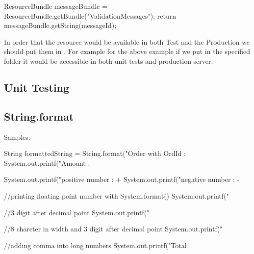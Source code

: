 \begin{javacode}
    ResourceBundle messageBundle = ResourceBundle.getBundle("ValidationMessages");
    return messageBundle.getString(messageId);
\end{javacode}

In order that the resource would be available in both Test and the Production we should put them in . For example for the above example if we put  in the specified folder it would be accessible in both unit tests and production server.
\subsection{Unit Testing}
\subsection{String.format}
Samples:

\begin{javacode}
	String formattedString = String.format("Order with OrdId : %
	 System.out.printf("Amount : %
	 
	 System.out.printf("positive number : +%
	 System.out.printf("negative number : -%
	 
	 //printing floating point number with System.format()
	 System.out.printf("%
	 
	 //3 digit after decimal point
	 System.out.printf("%
	 
	 //8 charcter in width and 3 digit after decimal point
	 System.out.printf("%
	 
	 //adding comma into long numbers
	 System.out.printf("Total %
\end{javacode}
